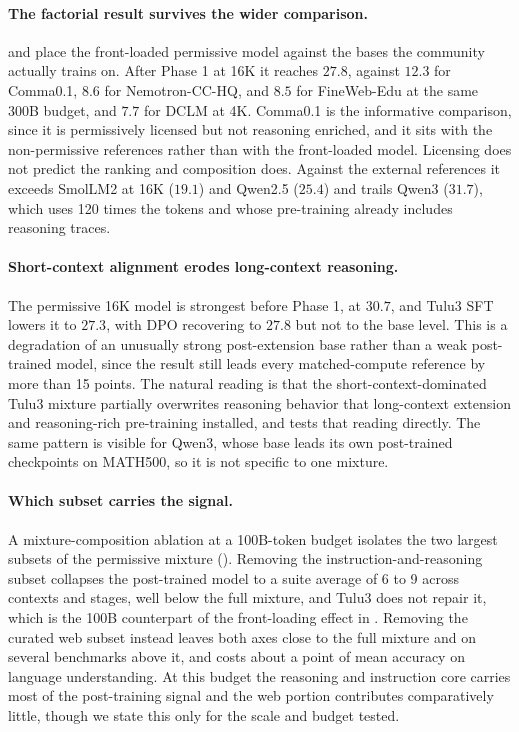 \documentclass{article}
\begin{document}
\paragraph{The factorial result survives the wider comparison.}
 and  place the front-loaded permissive model against the bases the community actually trains on. After Phase 1 at 16K it reaches $27.8$, against $12.3$ for Comma0.1, $8.6$ for Nemotron-CC-HQ, and $8.5$ for FineWeb-Edu at the same 300B budget, and $7.7$ for DCLM at 4K. Comma0.1 is the informative comparison, since it is permissively licensed but not reasoning enriched, and it sits with the non-permissive references rather than with the front-loaded model. Licensing does not predict the ranking and composition does. Against the external references it exceeds SmolLM2 at 16K ($19.1$) and Qwen2.5 ($25.4$) and trails Qwen3 ($31.7$), which uses 120 times the tokens and whose pre-training already includes reasoning traces.

\paragraph{Short-context alignment erodes long-context reasoning.}
The permissive 16K model is strongest before Phase 1, at $30.7$, and Tulu3 SFT lowers it to $27.3$, with DPO recovering to $27.8$ but not to the base level. This is a degradation of an unusually strong post-extension base rather than a weak post-trained model, since the result still leads every matched-compute reference by more than 15 points. The natural reading is that the short-context-dominated Tulu3 mixture partially overwrites reasoning behavior that long-context extension and reasoning-rich pre-training installed, and  tests that reading directly. The same pattern is visible for Qwen3, whose base leads its own post-trained checkpoints on MATH500, so it is not specific to one mixture.

\paragraph{Which subset carries the signal.}
A mixture-composition ablation at a 100B-token budget isolates the two largest subsets of the permissive mixture (). Removing the instruction-and-reasoning subset collapses the post-trained model to a suite average of 6 to 9 across contexts and stages, well below the full mixture, and Tulu3 does not repair it, which is the 100B counterpart of the front-loading effect in . Removing the curated web subset instead leaves both axes close to the full mixture and on several benchmarks above it, and costs about a point of mean accuracy on language understanding. At this budget the reasoning and instruction core carries most of the post-training signal and the web portion contributes comparatively little, though we state this only for the scale and budget tested.
\end{document}
